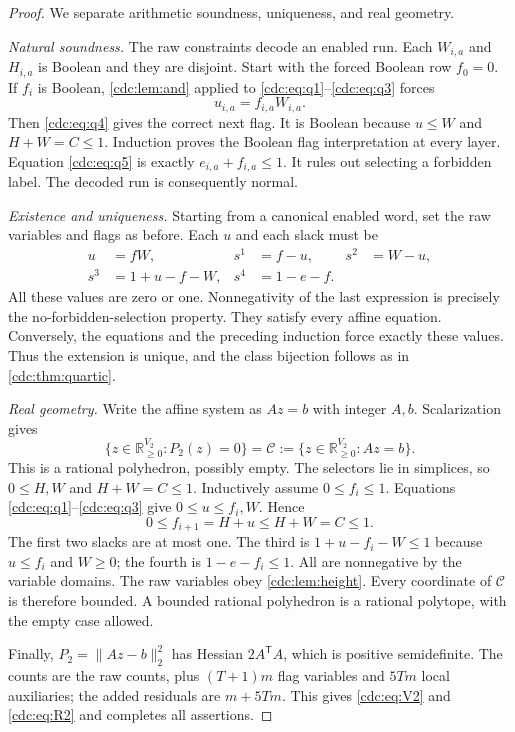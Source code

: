 \documentclass[11pt,a4paper]{article}
\theoremstyle{definition}
\theoremstyle{remark}
\newcommand{\R}{\mathbb R}
\begin{document}
\begin{proof}
We separate arithmetic soundness, uniqueness, and real geometry.

\emph{Natural soundness.} The raw constraints decode an enabled run. Each $W_{i,a}$ and $H_{i,a}$ is Boolean and they are disjoint. Start with the forced Boolean row $f_0=0$. If $f_i$ is Boolean, \cref{cdc:lem:and} applied to \eqref{cdc:eq:q1}--\eqref{cdc:eq:q3} forces
\[
u_{i,a}=f_{i,a}W_{i,a}.
\]
Then \eqref{cdc:eq:q4} gives the correct next flag. It is Boolean because $u\le W$ and $H+W=C\le1$. Induction proves the Boolean flag interpretation at every layer. Equation \eqref{cdc:eq:q5} is exactly $e_{i,a}+f_{i,a}\le1$. It rules out selecting a forbidden label. The decoded run is consequently normal.

\emph{Existence and uniqueness.} Starting from a canonical enabled word, set the raw variables and flags as before. Each $u$ and each slack must be
\begin{align*}
u&=fW,&s^1&=f-u,&s^2&=W-u,\\
s^3&=1+u-f-W,&s^4&=1-e-f.
\end{align*}
All these values are zero or one. Nonnegativity of the last expression is precisely the no-forbidden-selection property. They satisfy every affine equation. Conversely, the equations and the preceding induction force exactly these values. Thus the extension is unique, and the class bijection follows as in \cref{cdc:thm:quartic}.

\emph{Real geometry.} Write the affine system as $Az=b$ with integer $A,b$. Scalarization gives
\[
\{z\in\R_{\ge0}^{V_2}:P_2(z)=0\}
=\mathcal C:=\{z\in\R_{\ge0}^{V_2}:Az=b\}.
\]
This is a rational polyhedron, possibly empty. The selectors lie in simplices, so $0\le H,W$ and $H+W=C\le1$. Inductively assume $0\le f_i\le1$. Equations \eqref{cdc:eq:q1}--\eqref{cdc:eq:q3} give $0\le u\le f_i,W$. Hence
\[
0\le f_{i+1}=H+u\le H+W=C\le1.
\]
The first two slacks are at most one. The third is $1+u-f_i-W\le1$ because $u\le f_i$ and $W\ge0$; the fourth is $1-e-f_i\le1$. All are nonnegative by the variable domains. The raw variables obey \cref{cdc:lem:height}. Every coordinate of $\mathcal C$ is therefore bounded. A bounded rational polyhedron is a rational polytope, with the empty case allowed.

Finally, $P_2=\|Az-b\|_2^2$ has Hessian $2A^{\mathsf T}A$, which is positive semidefinite. The counts are the raw counts, plus $(T+1)m$ flag variables and $5Tm$ local auxiliaries; the added residuals are $m+5Tm$. This gives \eqref{cdc:eq:V2} and \eqref{cdc:eq:R2} and completes all assertions.
\end{proof}
\end{document}
